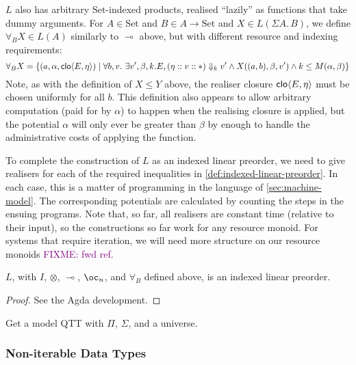 \documentclass[acmsmall,review]{acmart}
\newcommand{\Set}{\mathrm{Set}}
\newcommand{\bob}[1]{\textcolor{purple}{FIXME: #1}}
\begin{document}
$L$ also has arbitrary $\Set$-indexed products, realised ``lazily'' as
functions that take dummy arguments. For $A \in \Set$ and
$B \in A \to \Set$ and $X \in L(\Sigma A.\,B)$, we define
$\forall_B X \in L(A)$ similarly to $\multimap$ above, but with
different resource and indexing requirements:
\begin{displaymath}
  \forall_B X = \{ (a,\alpha,\mathsf{clo}\langle E , \eta \rangle) \mid \forall b, v.~\exists v', \beta, k. E, (\eta :: v :: *) \Downarrow_k v' \land X((a,b),\beta,v') \land k \leq M(\alpha,\beta) \}
\end{displaymath}
Note, as with the definition of $X \leq Y$ above, the realiser closure
$\mathsf{clo}\langle E , \eta \rangle$ must be chosen uniformly for all $b$. This definition
also appears to allow arbitrary computation (paid for by $\alpha$) to
happen when the realising closure is applied, but the potential
$\alpha$ will only ever be greater than $\beta$ by enough to handle
the administrative costs of applying the function.

To complete the construction of $L$ as an indexed linear preorder, we
need to give realisers for each of the required inequalities in
\autoref{def:indexed-linear-preorder}. In each case, this is a matter
of programming in the language of \autoref{sec:machine-model}. The
corresponding potentials are calculated by counting the steps in the
ensuing programs. Note that, so far, all realisers are constant time
(relative to their input), so the constructions so far work for any
resource monoid. For systems that require iteration, we will need more
structure on our resource monoids \bob{fwd ref}.

\begin{proposition}
  $L$, with $I$, $\otimes$, $\multimap$, $\oc_n$, and $\forall_{B}$ defined above, is
  an indexed linear preorder.
\end{proposition}

\begin{proof}
  See the Agda development.
\end{proof}

\begin{proposition}\label{prop:basic-qtt-realisability-model}
  Get a model QTT with $\Pi$, $\Sigma$, and a universe.
\end{proposition}

\subsubsection{Non-iterable Data Types}
\end{document}
